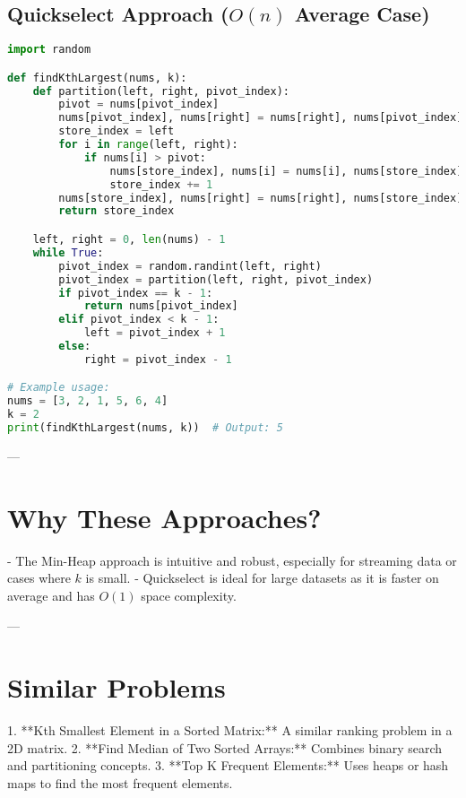 \subsection*{Quickselect Approach (\(O(n)\) Average Case)}
\begin{fullwidth}
\begin{lstlisting}[language=Python]
import random

def findKthLargest(nums, k):
    def partition(left, right, pivot_index):
        pivot = nums[pivot_index]
        nums[pivot_index], nums[right] = nums[right], nums[pivot_index]
        store_index = left
        for i in range(left, right):
            if nums[i] > pivot:
                nums[store_index], nums[i] = nums[i], nums[store_index]
                store_index += 1
        nums[store_index], nums[right] = nums[right], nums[store_index]
        return store_index

    left, right = 0, len(nums) - 1
    while True:
        pivot_index = random.randint(left, right)
        pivot_index = partition(left, right, pivot_index)
        if pivot_index == k - 1:
            return nums[pivot_index]
        elif pivot_index < k - 1:
            left = pivot_index + 1
        else:
            right = pivot_index - 1

# Example usage:
nums = [3, 2, 1, 5, 6, 4]
k = 2
print(findKthLargest(nums, k))  # Output: 5
\end{lstlisting}
\end{fullwidth}

---

\section*{Why These Approaches?}
- The Min-Heap approach is intuitive and robust, especially for streaming data or cases where \(k\) is small.
- Quickselect is ideal for large datasets as it is faster on average and has \(O(1)\) space complexity.

---

\section*{Similar Problems}
1. **Kth Smallest Element in a Sorted Matrix:** A similar ranking problem in a 2D matrix.
2. **Find Median of Two Sorted Arrays:** Combines binary search and partitioning concepts.
3. **Top K Frequent Elements:** Uses heaps or hash maps to find the most frequent elements.

